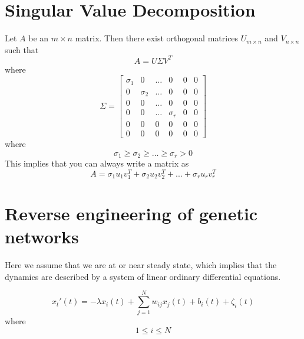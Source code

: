 \documentclass[10pt]{article}
\begin{document}
\section*{Singular Value Decomposition}
Let $A$ be an $m \times n$ matrix. Then there exist orthogonal matrices $U_{m \times n}$ and $V_{n \times n}$ such that \[ A = U \Sigma V^T \] where \[ \Sigma = \begin{bmatrix} \sigma_1 & 0 & \ldots & 0 & 0 & 0\\ 0 & \sigma_2 & \ldots & 0 & 0 & 0\\ 0 & 0 & \ldots & 0 & 0 & 0 \\ 0 & 0 & \ldots & \sigma_r & 0 & 0 \\ 0 & 0 & 0 & 0 & 0 & 0 \\ 0 & 0 & 0 & 0 & 0 & 0 \end{bmatrix} \] where \[ \sigma_1 \geq \sigma_2 \geq \ldots \geq \sigma_r > 0 \]
This implies that you can always write a matrix as \[ A = \sigma_1 u_1 v_1^T + \sigma_2 u_2 v_2^T + ... + \sigma_r u_r v_r^T \]

\section*{Reverse engineering of genetic networks}
Here we assume that we are at or near steady state, which implies that the dynamics are described by a system of linear ordinary differential equations.

\[ x_t'(t) = -\lambda x_i(t) + \sum_{j=1}^{N}w_{ij}x_j(t) + b_i(t) + \zeta_i(t) \] where \[ 1 \leq i \leq N \]
\end{document}

